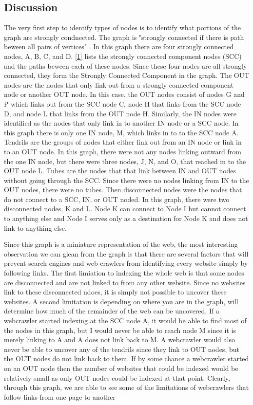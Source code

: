 \documentclass[12pt]{article}
\begin{document}
\subsection*{Discussion}
The very first step to identify types of nodes is to identify what portions of the graph are strongly condnected. The graph is "strongly connected if there is path beween all pairs of vertices" \cite{GeeksForGeeks}. In this graph there are four strongly connected nodes, A, B, C, and D. \ref{1} lists the strongly connected component nodes (SCC) and the paths beween each of these nodes. Since these four nodes are all strongly connected, they form the Strongly Connected Component in the graph. The OUT nodes are the nodes that only link out from a strongly connected component node or another OUT node. In this case, the OUT nodes consist of nodes G  and P which links out from the SCC node C, node H that links from the SCC node D, and node L that links from the OUT node H. Similarly, the IN nodes were identified as the nodes that only link in to another IN node or a SCC node. In this graph there is only one IN node, M, which links in to to the SCC node A. Tendrils are the groups of nodes that either link out from an IN node or link in to an OUT node. In this graph, there were not any nodes linking outward from the one IN node, but there were three nodes, J, N, and O, that reached in to the OUT node L. Tubes are the nodes that that link between IN and OUT nodes without going through the SCC. Since there were no nodes linking from IN to the OUT nodes, there were no tubes. Then disconnected nodes were the nodes that do not connect to a  SCC, IN, or OUT noded. In this graph, there were two disconnected nodes, K and I.. Node K can connect to Node I but cannot connect to anything else and Node I serves only as a destination for Node K and does not link to anything else. 

Since this graph is a miniature representation of the web, the most interesting observation we can glean from the graph is that there are several factors that will prevent search engines and web crawlers from identifying every website simply by following links. The first limiation to indexing the whole web is that some nodes are disconnected and are not linked to from any other website. Since no websites link to these disconnected ndoes, it is simply not possible to uncover these websites. A second limitation is depending on where you are in the graph, will determine how much of the remainder of the web can be uncovered. If a webcrawler started indexing at the SCC node A, it would be able to find most of the nodes in this graph, but I would never be able to reach node M since it is merely linking to A and A does not link back to M. A webcrawler would also never be able to uncover any of the tendrils since they link to OUT nodes, but the OUT nodes do not link back to them. If by some chance a webcrawler started on an OUT node then the number of websites that could be indexed would be relatively small as only OUT nodes could be indexed at that point. Clearly, through this graph, we are able to see some of the limitations of webcrawlers that follow links from one page to another
\end{document}
